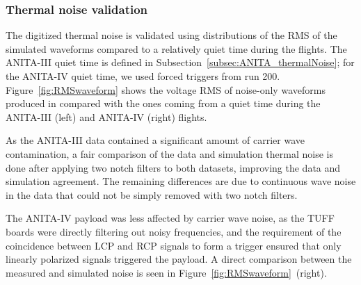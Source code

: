 \subsubsection{Thermal noise validation}
\label{subsec:ANITA_validation_thermalNoise}
The digitized thermal noise is validated using distributions of
the RMS of the simulated waveforms compared to a relatively quiet time
during the flights.
The ANITA-III quiet time is defined in Subsection~\ref{subsec:ANITA_thermalNoise}; for the ANITA-IV quiet time, we used forced triggers from run 200.
Figure~\ref{fig:RMSwaveform} shows the voltage RMS of noise-only waveforms produced
in \icemc compared with the ones coming from a quiet time during
the ANITA-III (left) and ANITA-IV (right) flights.

As the ANITA-III data contained a significant amount of carrier wave
contamination, a fair comparison of the data and simulation thermal noise is done after applying two notch filters to both datasets, improving the data and simulation agreement.
The remaining differences are due to continuous wave noise in the data that
could not be simply removed with two notch filters.

The ANITA-IV payload was less affected by carrier wave noise, as the TUFF boards were directly filtering out noisy frequencies, and the requirement of the coincidence between LCP and RCP signals to form a trigger ensured that only linearly polarized signals triggered the payload.
A direct comparison between the measured and simulated noise is seen in Figure~\ref{fig:RMSwaveform}~(right). 

